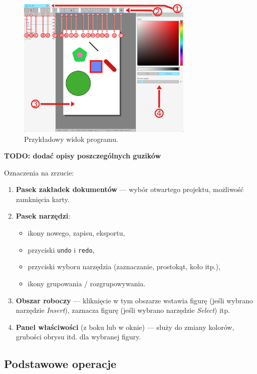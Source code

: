 \documentclass[a4paper,12pt]{article}
\begin{document}
\begin{figure}[h!]
    \centering
    \includegraphics[width=0.75\textwidth]{./vecedit_screenshot.png}
    \caption{Przykładowy widok programu.}
    \label{fig:screenshot}
\end{figure}

\textbf{TODO: dodać opisy poszczególnych guzików}

\noindent Oznaczenia na zrzucie:
\begin{enumerate}
    \item \textbf{Pasek zakładek dokumentów} — wybór otwartego projektu, 
    możliwość zamknięcia karty.
    \item \textbf{Pasek narzędzi}:
    \begin{itemize}
      \item ikony nowego, zapisu, eksportu,
      \item przyciski \texttt{undo} i \texttt{redo},
      \item przyciski wyboru narzędzia (zaznaczanie, prostokąt, koło itp.),
      \item ikony grupowania / rozgrupowywania.
    \end{itemize}
    \item \textbf{Obszar roboczy} — kliknięcie w tym obszarze wstawia figurę 
    (jeśli wybrano narzędzie \emph{Insert}), zaznacza figurę (jeśli wybrano 
    narzędzie \emph{Select}) itp.
    \item \textbf{Panel właściwości} (z boku lub w oknie) — służy do zmiany 
    kolorów, grubości obrysu itd. dla wybranej figury.
\end{enumerate}

\subsection{Podstawowe operacje}
\end{document}
